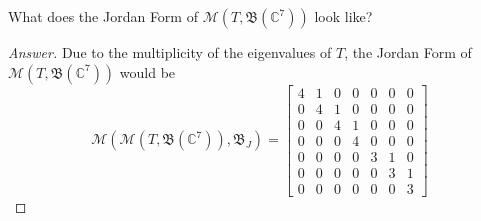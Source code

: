 \documentclass{article}
\newcommand{\parens}[1]{\left(#1\right)}
\newcommand{\sqbracks}[1]{\left[#1\right]}
\newcommand{\C}{\mathbb{C}}
\begin{document}
        \item What does the Jordan Form of $\mathcal{M}\parens{T, \mathfrak{B}\parens{\C^7}}$
        look like?
        \begin{proof}[Answer]
        Due to the multiplicity of the eigenvalues of $T$, the Jordan Form of 
        $\mathcal{M}\parens{T, \mathfrak{B}\parens{\C^7}}$ would be
        $$\mathcal{M}\parens{\mathcal{M}\parens{T, \mathfrak{B}\parens{\C^7}}, \mathfrak{B}_J}
        = \sqbracks{\begin{matrix}
            4 & 1 & 0 & 0 & 0 & 0 & 0 \\
            0 & 4 & 1 & 0 & 0 & 0 & 0 \\
            0 & 0 & 4 & 1 & 0 & 0 & 0 \\
            0 & 0 & 0 & 4 & 0 & 0 & 0 \\
            0 & 0 & 0 & 0 & 3 & 1 & 0 \\
            0 & 0 & 0 & 0 & 0 & 3 & 1 \\
            0 & 0 & 0 & 0 & 0 & 0 & 3 
        \end{matrix}}$$
        \end{proof}
\end{document}
